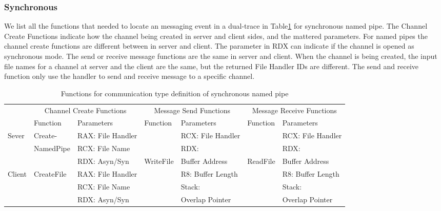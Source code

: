 \documentclass[paper=a4, fontsize=11pt]{scrartcl}
\numberwithin{equation}{section}		%
\numberwithin{figure}{section}			%
\numberwithin{table}{section}				%
\begin{document}
\subsubsection{Synchronous}
We list all the functions that needed to locate an messaging event in a dual-trace in Table\ref{synfunctions} for synchronous named pipe. The Channel Create Functions indicate how the channel being created in server and client sides, and the mattered parameters. For named pipes the channel create functions are different between in server and client. The parameter in RDX can indicate if the channel is opened as synchronous mode. The send or receive message functions are the same in server and client. When the channel is being created, the input file names for a channel at server and the client are the same, but the returned File Handler IDs are different. The send and receive function only use the handler to send and receive message to a specific channel. 
\begin{table}[h]
        \centering
        \caption{Functions for communication type definition of synchronous named pipe}
        \label{synfunctions}
        \begin{tabular}{|l|l|l|l|l|l|l|}
            \hline
             \multirow{2}{*}{} &
               \multicolumn{2}{c|}{Channel Create Functions} &
               \multicolumn{2}{c|}{Message Send Functions} &
               \multicolumn{2}{c|}{Message Receive Functions} \\
             \cline{2-7}
              & Function& Parameters & Function & Parameters  & Function & Parameters\\
             \hline
             Sever& Create-&  RAX: File Handler &  &  RCX: File Handler &&RCX: File Handler\\
             \cline{3-3} \cline{5-5} \cline{7-7}
             &NamedPipe&RCX: File Name && RDX:  &&RDX: \\
              \cline{3-3} 
             &&RDX: Asyn/Syn&WriteFile & Buffer Address &ReadFile&Buffer Address\\
                \cline{1-3} \cline{5-5} \cline{7-7}
             Client & CreateFile & RAX: File Handler & &  R8: Buffer Length &&R8: Buffer Length\\
              \cline{3-3} \cline{5-5} \cline{7-7}
             &&RCX: File Name &&Stack:&&Stack:\\
             \cline{3-3} 
             &&RDX: Asyn/Syn&& Overlap Pointer&&Overlap Pointer\\
            \hline
        \end{tabular}
    \end{table}
\end{document}
